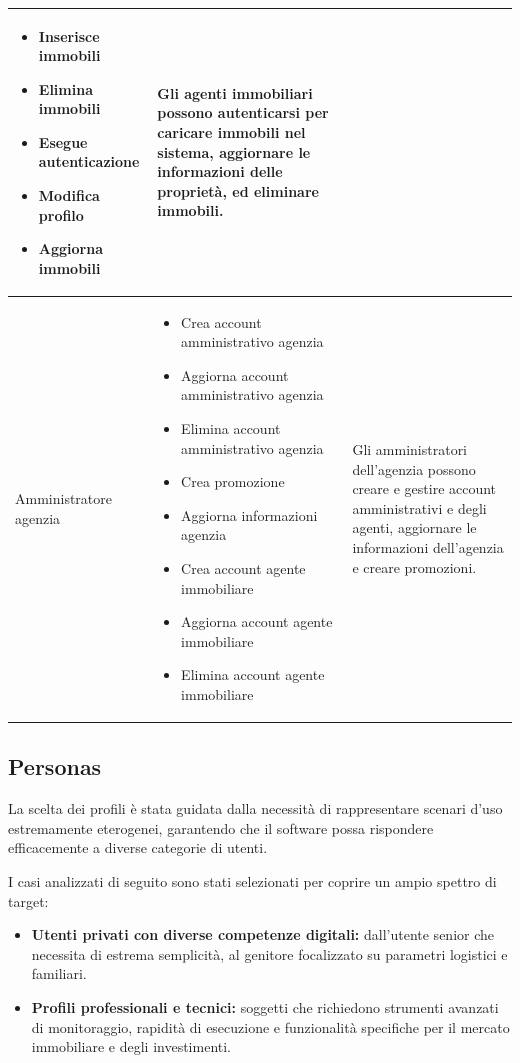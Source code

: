 \documentclass{article}
\begin{document}
\begin{tabularx}{\textwidth}{|>{\raggedright\arraybackslash}X|>{\raggedright\arraybackslash}X|>{\raggedright\arraybackslash}X|}
    \begin{itemize}
        \item Inserisce immobili
        \item Elimina immobili
        \item Esegue autenticazione
        \item Modifica profilo
        \item Aggiorna immobili
    \end{itemize}                   &
    Gli agenti immobiliari possono autenticarsi per caricare immobili nel sistema, aggiornare le informazioni delle proprietà, ed eliminare immobili.                                                                          \\
    \hline
    Amministratore agenzia                        &
    \begin{itemize}
        \item Crea account amministrativo agenzia
        \item Aggiorna account amministrativo agenzia
        \item Elimina account amministrativo agenzia
        \item Crea promozione
        \item Aggiorna informazioni agenzia
        \item Crea account agente immobiliare
        \item Aggiorna account agente immobiliare
        \item Elimina account agente immobiliare
    \end{itemize} &
    Gli amministratori dell'agenzia possono creare e gestire account amministrativi e degli agenti, aggiornare le informazioni dell'agenzia e creare promozioni.                                                               \\
    \hline
\end{tabularx}

\newpage
\subsection{Personas}
La scelta dei profili è stata guidata dalla necessità di rappresentare scenari d'uso estremamente eterogenei, garantendo che il software possa rispondere efficacemente a diverse categorie di utenti.

I casi analizzati di seguito sono stati selezionati per coprire un ampio spettro di target:
\begin{itemize}
    \item \textbf{Utenti privati con diverse competenze digitali:} dall'utente senior che necessita di estrema semplicità, al genitore focalizzato su parametri logistici e familiari.
    \item \textbf{Profili professionali e tecnici:} soggetti che richiedono strumenti avanzati di monitoraggio, rapidità di esecuzione e funzionalità specifiche per il mercato immobiliare e degli investimenti.
\end{itemize}
\end{document}
